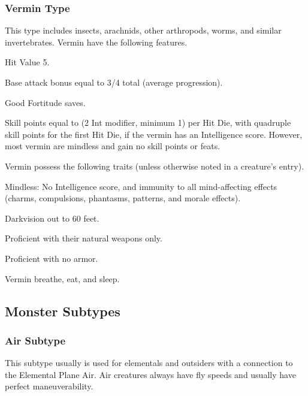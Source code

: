 {\subsubsection{Vermin Type} This type includes insects, arachnids, other arthropods, worms, and similar invertebrates.
 Vermin have the following features.
\begin{itemize*}
\item Hit Value 5.
\item Base attack bonus equal to 3/4 total  (average progression).
\item Good Fortitude saves.
\item Skill points equal to (2 \add Int modifier, minimum 1) per Hit Die, with quadruple skill points for the first Hit Die, if the vermin has an Intelligence score. However, most vermin are mindless and gain no skill points or feats.
\end{itemize*}
 Vermin possess the following traits (unless otherwise noted in a creature's entry).
\begin{itemize*}
\item Mindless: No Intelligence score, and immunity to all mind-affecting effects (charms, compulsions, phantasms, patterns, and morale effects).
\item Darkvision out to 60 feet.
\item Proficient with their natural weapons only.
\item Proficient with no armor.
\item Vermin breathe, eat, and sleep.
\end{itemize*}

\subsection{Monster Subtypes}

\subsubsection{Air Subtype} This subtype usually is used for elementals and outsiders with a connection to the Elemental Plane Air. Air creatures always have fly speeds and usually have perfect maneuverability.

}
